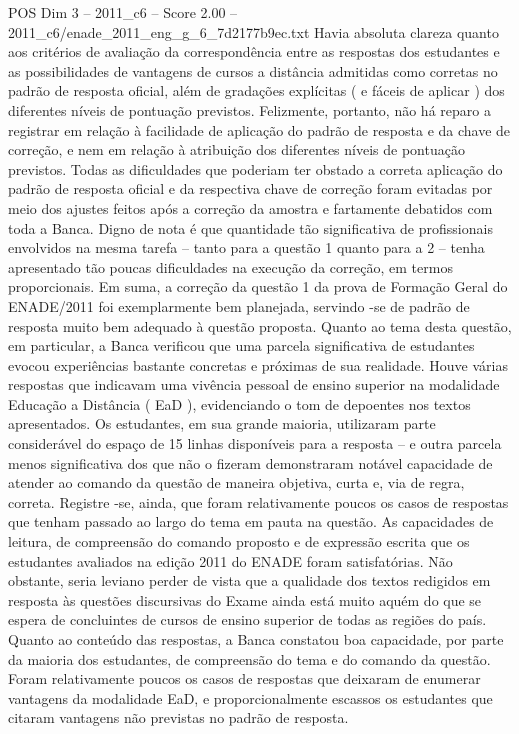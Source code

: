\begin{textsample}{POS Dim 3 – 2011\_c6 – Score 2.00 – 2011\_c6/enade\_2011\_eng\_g\_6\_7d2177b9ec.txt}
Havia absoluta clareza quanto aos critérios de avaliação da correspondência entre as respostas dos estudantes e as possibilidades de vantagens de cursos a distância admitidas como corretas no padrão de resposta oficial, além de gradações explícitas ( e fáceis de aplicar ) dos diferentes níveis de pontuação previstos.
Felizmente, portanto, não há reparo a registrar em relação à facilidade de aplicação do padrão de resposta e da chave de correção, e nem em relação à atribuição dos diferentes níveis de pontuação previstos.
Todas as dificuldades que poderiam ter obstado a correta aplicação do padrão de resposta oficial e da respectiva chave de correção foram evitadas por meio dos ajustes feitos após a correção da amostra e fartamente debatidos com toda a Banca.
Digno de nota é que quantidade tão significativa de profissionais envolvidos na mesma tarefa – tanto para a questão 1 quanto para a 2 – tenha apresentado tão poucas dificuldades na execução da correção, em termos proporcionais.
Em suma, a correção da questão 1 da prova de Formação Geral do ENADE/2011 foi exemplarmente bem planejada, servindo -se de padrão de resposta muito bem adequado à questão proposta.
Quanto ao tema desta questão, em particular, a Banca verificou que uma parcela significativa de estudantes evocou experiências bastante concretas e próximas de sua realidade.
Houve várias respostas que indicavam uma vivência pessoal de ensino superior na modalidade Educação a Distância ( EaD ), evidenciando o tom de depoentes nos textos apresentados.
Os estudantes, em sua grande maioria, utilizaram parte considerável do espaço de 15 linhas disponíveis para a resposta – e outra parcela menos significativa dos que não o fizeram demonstraram notável capacidade de atender ao comando da questão de maneira objetiva, curta e, via de regra, correta.
Registre -se, ainda, que foram relativamente poucos os casos de respostas que tenham passado ao largo do tema em pauta na questão.
As capacidades de leitura, de compreensão do comando proposto e de expressão escrita que os estudantes avaliados na edição 2011 do ENADE foram satisfatórias.
Não obstante, seria leviano perder de vista que a qualidade dos textos redigidos em resposta às questões discursivas do Exame ainda está muito aquém do que se espera de concluintes de cursos de ensino superior de todas as regiões do país.
Quanto ao conteúdo das respostas, a Banca constatou boa capacidade, por parte da maioria dos estudantes, de compreensão do tema e do comando da questão.
Foram relativamente poucos os casos de respostas que deixaram de enumerar vantagens da modalidade EaD, e proporcionalmente escassos os estudantes que citaram vantagens não previstas no padrão de resposta.

\end{textsample}
